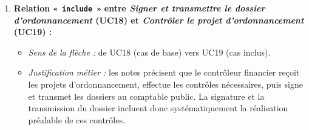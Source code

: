 \begin{enumerate}
  \item \textbf{Relation \texttt{« include »} entre \emph{Signer et transmettre le dossier d'ordonnancement} (UC18) et \emph{Contrôler le projet d'ordonnancement} (UC19) :}
  \begin{itemize}
    \item \emph{Sens de la flèche :} de UC18 (cas de base) vers UC19 (cas inclus).
    \item \emph{Justification métier :} les notes précisent que le contrôleur financier reçoit les projets d'ordonnancement, effectue les contrôles nécessaires, puis signe et transmet les dossiers au comptable public. La signature et la transmission du dossier incluent donc systématiquement la réalisation préalable de ces contrôles.
  \end{itemize}
\end{enumerate}
